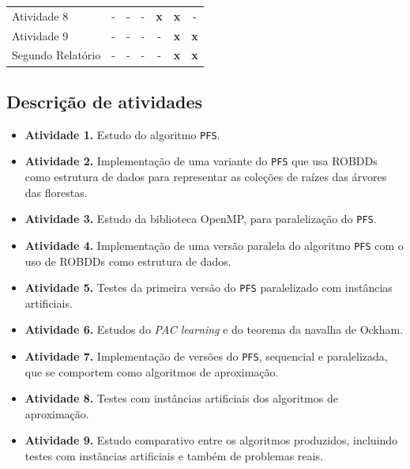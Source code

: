 \documentclass[12pt]{article}
\begin{document}
\begin{table}[!ht]
\begin{center}
\begin{tabular}{l ccc ccc}
    \small Atividade 8  
    & \small - & \small - & \small - & \small {\bf x} & \small {\bf x} 
    & \small - \\

    \small Atividade 9
    & \small - & \small - & \small - & \small - & \small {\bf x} 
    & \small {\bf x}\\

    \small Segundo Relatório
    & \small - & \small - & \small - & \small - & \small {\bf x} 
    & \small {\bf x}\\
    \bottomrule
\end{tabular}
\end{center}
\end{table}

\subsection{Descrição de atividades} \label{sec:atividades}
\begin{itemize}
    \item{\bf Atividade 1.}
        Estudo do algoritmo {\tt PFS}.
    \item{\bf Atividade 2.}
        Implementação de uma variante do {\tt PFS} que usa ROBDDs como 
        estrutura de dados para representar as coleções de raízes das árvores das florestas.
    \item{\bf Atividade 3.}
        Estudo da biblioteca OpenMP, para paralelização do {\tt PFS}.
    \item{\bf Atividade 4.}
        Implementação de uma versão paralela do algoritmo {\tt PFS} com
        o uso de ROBDDs como estrutura de dados.
    \item{\bf Atividade 5.}
        Testes da primeira versão do {\tt PFS} paralelizado com instâncias
        artificiais.
    \item{\bf Atividade 6.}
        Estudos do {\em PAC learning} e do teorema da navalha de Ockham.
    \item{\bf Atividade 7.} 
        Implementação de versões do {\tt PFS}, sequencial e paralelizada, que se 
        comportem como algoritmos de aproximação.
    \item{\bf Atividade 8.}
        Testes com instâncias artificiais dos algoritmos de aproximação.
    \item{\bf Atividade 9.}
        Estudo comparativo entre os algoritmos produzidos, incluindo testes com instâncias artificiais e também de problemas reais.
\end{itemize}
\end{document}
